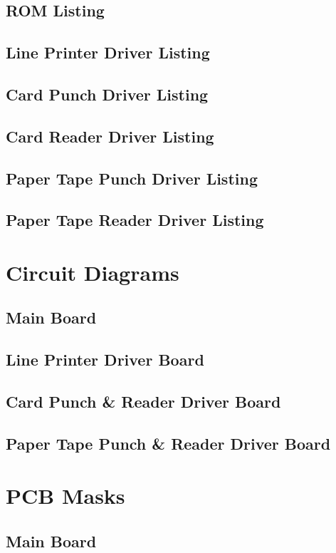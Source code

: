 \documentclass{book}
\begin{document}
\section{ROM Listing}
\cleardoublepage
\section{Line Printer Driver Listing}

\cleardoublepage
\section{Card Punch Driver Listing}
\cleardoublepage
\section{Card Reader Driver Listing}
\cleardoublepage
\section{Paper Tape Punch Driver Listing}
\cleardoublepage
\section{Paper Tape Reader Driver Listing}
\chapter{Circuit Diagrams}
\section{Main Board}
\cleardoublepage
\section{Line Printer Driver Board}
\cleardoublepage
\section{Card Punch \& Reader Driver Board}
\cleardoublepage
\section{Paper Tape Punch \& Reader Driver Board}
\chapter{PCB Masks}
\section{Main Board}
\cleardoublepage
\end{document}
